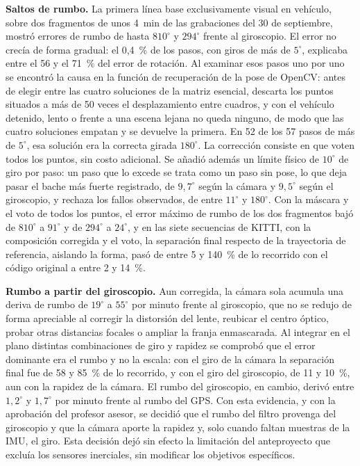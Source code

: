 \textbf{Saltos de rumbo.}
La primera línea base exclusivamente visual en vehículo, sobre dos fragmentos de unos 4~min de las grabaciones del 30 de septiembre, mostró errores de rumbo de hasta $810^{\circ}$ y $294^{\circ}$ frente al giroscopio.
El error no crecía de forma gradual: el 0,4~\% de los pasos, con giros de más de $5^{\circ}$, explicaba entre el 56 y el 71~\% del error de rotación.
Al examinar esos pasos uno por uno se encontró la causa en la función de recuperación de la pose de OpenCV: antes de elegir entre las cuatro soluciones de la matriz esencial, descarta los puntos situados a más de 50 veces el desplazamiento entre cuadros, y con el vehículo detenido, lento o frente a una escena lejana no queda ninguno, de modo que las cuatro soluciones empatan y se devuelve la primera.
En 52 de los 57 pasos de más de $5^{\circ}$, esa solución era la correcta girada $180^{\circ}$.
La corrección consiste en que voten todos los puntos, sin costo adicional.
Se añadió además un límite físico de $10^{\circ}$ de giro por paso: un paso que lo excede se trata como un paso sin pose, lo que deja pasar el bache más fuerte registrado, de $9{,}7^{\circ}$ según la cámara y $9{,}5^{\circ}$ según el giroscopio, y rechaza los fallos observados, de entre $11^{\circ}$ y $180^{\circ}$.
Con la máscara y el voto de todos los puntos, el error máximo de rumbo de los dos fragmentos bajó de $810^{\circ}$ a $91^{\circ}$ y de $294^{\circ}$ a $24^{\circ}$, y en las siete secuencias de KITTI, con la composición corregida y el voto, la separación final respecto de la trayectoria de referencia, aislando la forma, pasó de entre 5 y 140~\% de lo recorrido con el código original a entre 2 y 14~\%.

\textbf{Rumbo a partir del giroscopio.}
Aun corregida, la cámara sola acumula una deriva de rumbo de $19^{\circ}$ a $55^{\circ}$ por minuto frente al giroscopio, que no se redujo de forma apreciable al corregir la distorsión del lente, reubicar el centro óptico, probar otras distancias focales o ampliar la franja enmascarada.
Al integrar en el plano distintas combinaciones de giro y rapidez se comprobó que el error dominante era el rumbo y no la escala: con el giro de la cámara la separación final fue de 58 y 85~\% de lo recorrido, y con el giro del giroscopio, de 11 y 10~\%, aun con la rapidez de la cámara.
El rumbo del giroscopio, en cambio, derivó entre $1{,}2^{\circ}$ y $1{,}7^{\circ}$ por minuto frente al rumbo del GPS.
Con esta evidencia, y con la aprobación del profesor asesor, se decidió que el rumbo del filtro provenga del giroscopio y que la cámara aporte la rapidez y, solo cuando faltan muestras de la IMU, el giro.
Esta decisión dejó sin efecto la limitación del anteproyecto que excluía los sensores inerciales, sin modificar los objetivos específicos.

